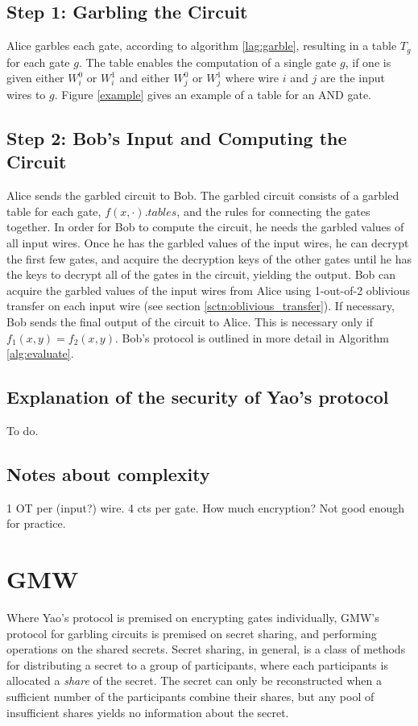 \subsection{Step 1: Garbling the Circuit}
Alice garbles each gate, according to algorithm \ref{lag:garble}, resulting in a table $T_g$ for each gate $g$.
The table enables the computation of a single gate $g$, if one is given either $W^0_i$ or $W^1_i$ and either $W^0_j$ or $W^1_j$ where wire $i$ and $j$ are the input wires to $g$.
Figure \ref{example} gives an example of a table for an AND gate.

\subsection{Step 2: Bob's Input and Computing the Circuit}
Alice sends the garbled circuit to Bob. 
The garbled circuit consists of a garbled table for each gate, $f(x,\cdot).tables$, and the rules for connecting the gates together.
In order for Bob to compute the circuit, he needs the garbled values of all input wires.
Once he has the garbled values of the input wires, he can decrypt the first few gates, and acquire the decryption keys of the other gates until he has the keys to decrypt all of the gates in the circuit, yielding the output.
Bob can acquire the garbled values of the input wires from Alice using 1-out-of-2 oblivious transfer on each input wire (see section \ref{sctn:oblivious_transfer}).
If necessary, Bob sends the final output of the circuit to Alice. 
This is necessary only if $f_1(x,y) = f_2(x,y)$. 
Bob's protocol is outlined in more detail in Algorithm \ref{alg:evaluate}.

\subsection{Explanation of the security of Yao's protocol}
To do.

\subsection{Notes about complexity}
1 OT per (input?) wire.
4 cts per gate.
How much encryption?
Not good enough for practice.

\section{GMW}
Where Yao's protocol is premised on encrypting gates individually, GMW's protocol for garbling circuits is premised on secret sharing, and performing operations on the shared secrets. 
Secret sharing, in general, is a class of methods for distributing a secret to a group of participants, where each participants is allocated a \textit{share} of the secret. 
The secret can only be reconstructed when a sufficient number of the participants combine their shares, but any pool of insufficient shares yields no information about the secret.

